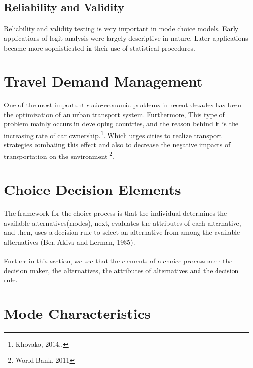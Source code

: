 \subsection{Reliability and Validity}
\paragraph{}Reliability and validity testing is very important in mode choice models. Early applications of logit analysis were largely descriptive in nature. Later applications became more sophisticated in their use of statistical procedures.

\section{Travel Demand Management}
\paragraph{}One of the most important socio-economic problems in recent decades has been the optimization of an urban transport system. Furthermore, This type of problem mainly occurs in developing countries, and the reason behind it is the increasing rate of car ownership.\footnote{Khovako, 2014,.}. Which urges cities to realize transport strategies combating this effect and also to decrease the negative impacts of transportation on the environment \footnote{World Bank, 2011}.

\section{Choice Decision Elements}
\paragraph{}The framework for the choice process is that the individual determines the available alternatives(modes), next, evaluates the attributes of each alternative, and then, uses a decision rule to select an alternative from among the available alternatives (Ben-Akiva and Lerman, 1985).
\paragraph{}Further in this section, we see that the elements of a choice process are : the decision maker, the alternatives, the attributes of alternatives and the decision rule.

\section{Mode Characteristics}
